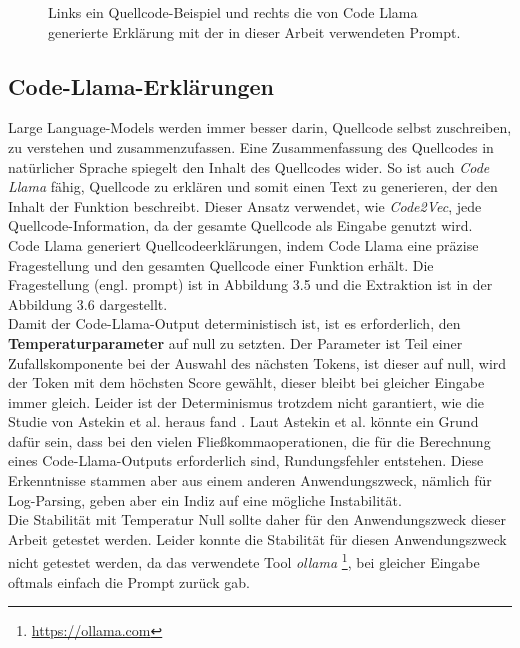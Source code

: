\documentclass[12pt,letterpaper,ngerman]{article}
\begin{document}
\begin{figure}
  \begin{center}
    \begin{minipage}[c]{6cm}
        \centering
        \inputminted[fontsize=\scriptsize]{c}{summary.c}
    \end{minipage}
    \hspace{0.1cm}
    \begin{minipage}[c]{6cm}
        \centering
        \inputminted[fontsize=\scriptsize,breaklines]{json}{summary.json}
    \end{minipage}
  \end{center}
  \caption{
  Links ein Quellcode-Beispiel und rechts die von 
  Code Llama generierte Erklärung mit der in dieser 
  Arbeit verwendeten Prompt.
}
\end{figure}
\subsection{Code-Llama-Erklärungen}
Large Language-Models werden immer besser darin, Quellcode selbst
zuschreiben, zu verstehen und zusammenzufassen. Eine Zusammenfassung des Quellcodes
in natürlicher Sprache spiegelt den Inhalt des Quellcodes wider.
So ist auch \textit{Code Llama} fähig, Quellcode zu erklären und
somit einen Text zu generieren, der den Inhalt der Funktion 
beschreibt. Dieser Ansatz verwendet, wie \textit{Code2Vec},
jede Quellcode-Information, da der 
gesamte Quellcode als Eingabe genutzt wird.\\
Code Llama generiert Quellcodeerklärungen, indem Code Llama eine
präzise  Fragestellung und den gesamten Quellcode einer 
Funktion erhält.
Die Fragestellung (engl. prompt) ist in Abbildung 3.5
und die Extraktion ist in der Abbildung 3.6 dargestellt.\\
Damit der Code-Llama-Output deterministisch ist,
ist es erforderlich, den {\bf Temperaturparameter} auf
null zu setzten. 
Der Parameter ist Teil einer Zufallskomponente bei der
Auswahl des nächsten Tokens, ist dieser auf null,
wird der Token mit dem höchsten Score gewählt, dieser 
bleibt bei gleicher Eingabe immer gleich. Leider ist der
Determinismus trotzdem nicht garantiert, 
wie die Studie von Astekin et al. heraus fand
\cite{llmstable}. Laut Astekin et al. könnte ein Grund dafür sein,
dass bei den vielen Fließkommaoperationen, die für die Berechnung
eines Code-Llama-Outputs erforderlich sind,
Rundungsfehler entstehen. Diese Erkenntnisse stammen aber 
aus einem anderen Anwendungszweck, nämlich für Log-Parsing, 
geben aber ein Indiz auf eine mögliche Instabilität.\\
Die Stabilität mit Temperatur Null sollte daher für den
Anwendungszweck dieser Arbeit getestet werden. Leider 
konnte die Stabilität für diesen Anwendungszweck nicht 
getestet werden, da das verwendete Tool \textit{ollama}
\footnote{\url{https://ollama.com}}, bei gleicher
Eingabe oftmals einfach die Prompt zurück gab.
\end{document}

